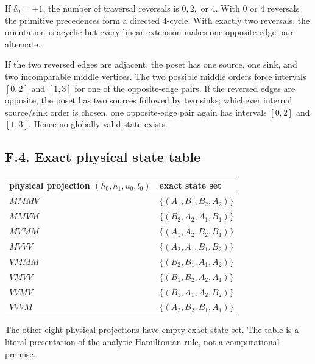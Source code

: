 \documentclass[11pt]{article}
\theoremstyle{definition}
\theoremstyle{remark}
\begin{document}
If \(\delta_0=+1\), the number of traversal reversals is \(0,2,\) or
\(4\). With \(0\) or \(4\) reversals the primitive precedences form a
directed \(4\)-cycle. With exactly two reversals, the orientation is
acyclic but every linear extension makes one opposite-edge pair
alternate.

If the two reversed edges are adjacent, the poset has one source, one
sink, and two incomparable middle vertices. The two possible middle
orders force intervals \([0,2]\) and \([1,3]\) for one of the
opposite-edge pairs. If the reversed edges are opposite, the poset has
two sources followed by two sinks; whichever internal source/sink order
is chosen, one opposite-edge pair again has intervals \([0,2]\) and
\([1,3]\). Hence no globally valid state exists.

\subsection{F.4. Exact physical state
table}\label{f.4.-exact-physical-state-table}

\begin{longtable}[]{@{}ll@{}}
\toprule\noalign{}
physical projection \((h_0,h_1,u_0,l_0)\) & exact state set \\
\midrule\noalign{}
\endhead
\bottomrule\noalign{}
\endlastfoot
\(MMMV\) & \(\{(A_1,B_1,B_2,A_2)\}\) \\
\(MMVM\) & \(\{(B_2,A_2,A_1,B_1)\}\) \\
\(MVMM\) & \(\{(A_1,A_2,B_2,B_1)\}\) \\
\(MVVV\) & \(\{(A_2,A_1,B_1,B_2)\}\) \\
\(VMMM\) & \(\{(B_2,B_1,A_1,A_2)\}\) \\
\(VMVV\) & \(\{(B_1,B_2,A_2,A_1)\}\) \\
\(VVMV\) & \(\{(B_1,A_1,A_2,B_2)\}\) \\
\(VVVM\) & \(\{(A_2,B_2,B_1,A_1)\}\) \\
\end{longtable}

The other eight physical projections have empty exact state set. The
table is a literal presentation of the analytic Hamiltonian rule, not a
computational premise.
\end{document}
